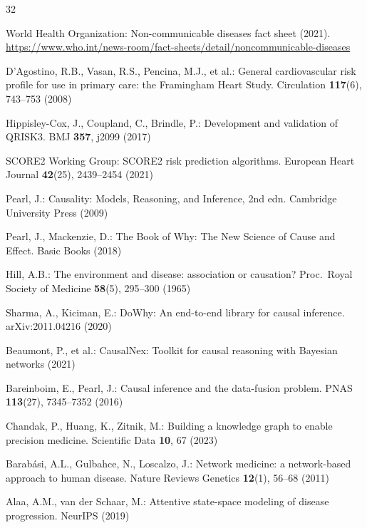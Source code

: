 \documentclass[runningheads]{llncs}
\begin{document}
\begin{thebibliography}{32}

World Health Organization:
Non-communicable diseases fact sheet (2021).
\url{https://www.who.int/news-room/fact-sheets/detail/noncommunicable-diseases}

D'Agostino, R.B., Vasan, R.S., Pencina, M.J., et al.:
General cardiovascular risk profile for use in primary care:
the Framingham Heart Study.
Circulation \textbf{117}(6), 743--753 (2008)

Hippisley-Cox, J., Coupland, C., Brindle, P.:
Development and validation of QRISK3.
BMJ \textbf{357}, j2099 (2017)

SCORE2 Working Group:
SCORE2 risk prediction algorithms.
European Heart Journal \textbf{42}(25), 2439--2454 (2021)

Pearl, J.:
Causality: Models, Reasoning, and Inference, 2nd edn.
Cambridge University Press (2009)

Pearl, J., Mackenzie, D.:
The Book of Why: The New Science of Cause and Effect.
Basic Books (2018)

Hill, A.B.:
The environment and disease: association or causation?
Proc.\ Royal Society of Medicine \textbf{58}(5), 295--300 (1965)

Sharma, A., Kiciman, E.:
DoWhy: An end-to-end library for causal inference.
arXiv:2011.04216 (2020)

Beaumont, P., et al.:
CausalNex: Toolkit for causal reasoning with Bayesian networks (2021)

Bareinboim, E., Pearl, J.:
Causal inference and the data-fusion problem.
PNAS \textbf{113}(27), 7345--7352 (2016)

Chandak, P., Huang, K., Zitnik, M.:
Building a knowledge graph to enable precision medicine.
Scientific Data \textbf{10}, 67 (2023)

Barab\'{a}si, A.L., Gulbahce, N., Loscalzo, J.:
Network medicine: a network-based approach to human disease.
Nature Reviews Genetics \textbf{12}(1), 56--68 (2011)

Alaa, A.M., van der Schaar, M.:
Attentive state-space modeling of disease progression.
NeurIPS (2019)


\end{thebibliography}
\end{document}
